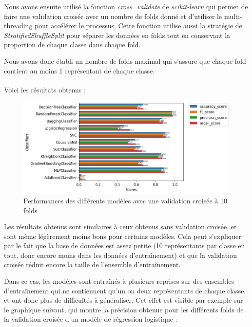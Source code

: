 \documentclass{article}
\begin{document}
Nous avons ensuite utilisé la fonction \textit{cross\_validate} \cite{CV} de \textit{scikit-learn}
qui permet de faire une validation croisée avec un nombre de folds donné et d'utiliser 
le multi-threading pour accélérer le processus. Cette fonction utilise aussi la 
stratégie de \textit{StratifiedShuffleSplit} \cite{SSS} pour séparer les données en
folds tout en conservant la proportion de chaque classe dans chaque fold.

Nous avons donc établi un nombre de folds maximal qui s'assure que chaque fold 
contient au moins 1 représentant de chaque classe.
\\\\
Voici les résultats obtenus :

\begin{figure}[h]
    \centering
    \includegraphics[width=1.2\textwidth]{img/all_perfs_with_cv.png}
    \caption{Performances des différents modèles avec une validation croisée à 10 folds}
\end{figure}

Les résultats obtenus sont similaires à ceux obtenus sans validation croisée, et sont
même légèrement moins bons pour certains modèles. Cela peut s'expliquer par le fait
que la base de données est assez petite (10 représentants par classe en tout, donc
encore moins dans les données d'entraînement) et que la validation croisée réduit encore
la taille de l'ensemble d'entraînement. 

Dans ce cas, les modèles sont entraînés à plusieurs reprises
sur des ensembles d'entraînement qui ne contiennent qu'un ou deux représentants de chaque classe,
et ont donc plus de difficultés à généraliser. Cet effet est visible par exemple sur le 
graphique suivant, qui montre la précision obtenue pour les différents folds de la validation
croisée d'un modèle de régression logistique :
\end{document}
